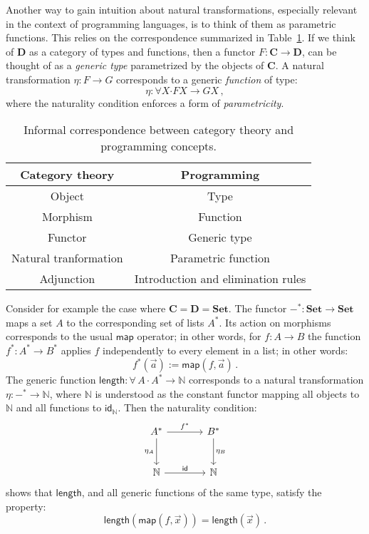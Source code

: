 \documentclass[draft,11pt]{report}
\theoremstyle{definition}
\newcommand{\kw}[1]{\ensuremath{ \mathsf{#1} }}
\newcommand{\bdot}{\boldsymbol{\cdot}}
\begin{document}
Another way to gain intuition about natural transformations,
especially relevant in the context of programming languages,
is to think of them as parametric functions.
This relies on the correspondence summarized in Table~\ref{tbl:catpl}.
If we think of $\mathbf{D}$ as a category of types and functions,
then a functor
$F : \mathbf{C} \rightarrow \mathbf{D}$,
can be thought of as a \emph{generic type}
parametrized by the objects of $\mathbf{C}$.
A natural transformation $\eta : F \rightarrow G$
corresponds to a generic \emph{function} of type:
\[
  \eta : \forall X \bdot
    F X \rightarrow G X
  \,,
\]
where the naturality condition
enforces a form of \emph{parametricity}.

\begin{table} %
  \centering
  \begin{tabular}{cc}
    \hline
    Category theory & Programming \\
    \hline
    Object & Type \\
    Morphism & Function \\
    Functor & Generic type \\
    Natural tranformation & Parametric function \\
    Adjunction & Introduction and elimination rules \\
    \hline
  \end{tabular}
  \caption{Informal correspondence between category theory and
    programming concepts.}
  \label{tbl:catpl}
\end{table}

Consider for example the case where
$\mathbf{C} = \mathbf{D} = \mathbf{Set}$.
The functor ${-}^* : \mathbf{Set} \rightarrow \mathbf{Set}$
maps a set $A$ to the corresponding set of lists $A^*$.
Its action on morphisms corresponds to the usual $\kw{map}$ operator;
in other words, for $f : A \rightarrow B$
the function $f^* : A^* \rightarrow B^*$
applies $f$ independently to every element in a list;
in other words:
\[
  f^*(\vec{a}) := \kw{map}(f, \vec{a})
  \,.
\]
The generic function
$
  \kw{length} : \forall \, A \, \bdot \, A^* \rightarrow \mathbb{N}
$
corresponds to a natural transformation
$\eta : -^* \rightarrow \mathbb{N}$,
where $\mathbb{N}$ is understood as the constant functor
mapping all objects to $\mathbb{N}$ and all functions to $\kw{id}_\mathbb{N}$.
Then the naturality condition:
\[
  \begin{tikzcd}[sep=large]
    A^* \ar[r, "f^*"] \ar[d, "\eta_A"'] & B^* \ar[d, "\eta_B"] \\
    \mathbb{N} \ar[r, "\kw{id}"] & \mathbb{N}
  \end{tikzcd}
\]
shows that \kw{length}, and all generic functions of the same type,
satisfy the property:
\[
  \kw{length}(\kw{map}(f, \vec{x})) = \kw{length}(\vec{x})
  \,.
\]
\end{document}
